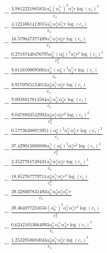 \documentclass[10pt]{article}
\begin{document}
\begin{align*}
&{}  - \frac{3.9812221865831 \alpha_{0}^s \left(\alpha_{1}^{c_s}\right)^{2} \alpha_{1}^s r \log{\left(c_{s} \right)}^{2}}{c_{s}} \\
&{}  - \frac{4.1224061412015 \alpha_{0}^{c_s} \alpha_{1}^s \alpha_{3}^{c_s} r \log{\left(c_{s} \right)}}{c_{s}} \\
&{}  - \frac{16.579647377489 \alpha_{1}^{c_s} \alpha_{1}^s \alpha_{2}^s r \log{\left(c_{s} \right)}}{c_{s}} \\
&{}  - \frac{0.27187440476795 \alpha_{0}^{c_s} \left(\alpha_{0}^s\right)^{2} \alpha_{1}^s r^{3} \log{\left(c_{s} \right)}^{4}}{c_{s}^{3}} \\
&{}  - \frac{8.8116100095061 \alpha_{0}^{c_s} \left(\alpha_{0}^s\right)^{3} \alpha_{2}^{c_s} r \log{\left(c_{s} \right)}}{c_{s}} \\
&{}  - \frac{8.9170765134013 \alpha_{0}^s \alpha_{1}^{c_s} \alpha_{3}^s r \log{\left(c_{s} \right)}}{c_{s}} \\
&{}  - \frac{9.0038817814584 \alpha_{0}^{c_s} \alpha_{2}^{c_s} \alpha_{2}^s r \log{\left(c_{s} \right)}}{c_{s}} \\
&{}  - \frac{9.0478933542992 \alpha_{0}^s \alpha_{1}^s \alpha_{2}^s r^{2} \log{\left(c_{s} \right)}^{2}}{c_{s}^{2}} \\
&{}  - \frac{0.57736388873951 \left(\alpha_{0}^s\right)^{2} \alpha_{1}^{c_s} \alpha_{2}^{c_s} r \log{\left(c_{s} \right)}^{2}}{c_{s}} \\
&{}  - \frac{37.429015060888 \alpha_{0}^{c_s} \left(\alpha_{0}^s\right)^{3} \alpha_{1}^s r^{2} \log{\left(c_{s} \right)}^{2}}{c_{s}^{2}} \\
&{}  - \frac{2.3527781749431 \alpha_{0}^{c_s} \alpha_{1}^s \alpha_{3}^s r \log{\left(c_{s} \right)}^{3}}{c_{s}} \\
&{}  - \frac{18.852767779711 \alpha_{0}^s \alpha_{1}^{c_s} \alpha_{1}^s r^{3} \log{\left(c_{s} \right)}}{c_{s}^{3}} \\
&{}  - \frac{39.328007831493 \alpha_{0}^{c_s} \alpha_{0}^s \alpha_{1}^s \alpha_{2}^{c_s} r}{c_{s}} \\
&{}  - \frac{39.364077231656 \left(\alpha_{0}^{c_s}\right)^{2} \alpha_{1}^{c_s} \alpha_{1}^s r^{2} \log{\left(c_{s} \right)}}{c_{s}^{2}} \\
&{}  - \frac{0.62421053664093 \alpha_{0}^{c_s} \alpha_{1}^{c_s} \alpha_{3}^s r \log{\left(c_{s} \right)}^{3}}{c_{s}} \\
&{}  - \frac{1.2532858684043 \alpha_{0}^s \alpha_{1}^{c_s} \alpha_{3}^s r \log{\left(c_{s} \right)}^{3}}{c_{s}} \\

\end{align*}
\end{document}
